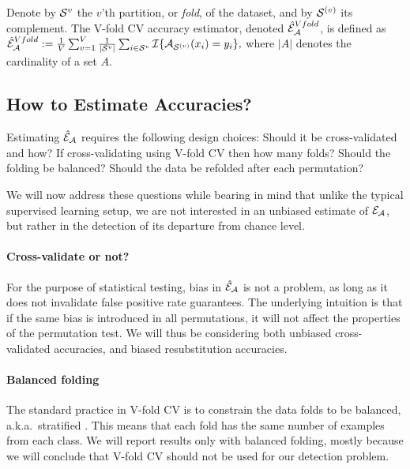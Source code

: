 \documentclass[]{bio}
\begin{document}
\begin{definition}
	\label{def:v-fold}
	Denote by $\mathcal{S}^{v}$ the $v$'th partition, or \emph{fold}, of the dataset, and by $\mathcal{S}^{(v)}$ its complement.
	The V-fold CV accuracy estimator, denoted $\hat{\mathcal{E}}_{\mathcal{A}}^{Vfold}$, is defined as 	
	$\hat{\mathcal{E}}_{\mathcal{A}}^{Vfold} := 
	\frac 1V \sum_{v=1}^{V} \frac{1}{|\mathcal{S}^v|} \sum_{i \in \mathcal{S}^{v}} \mathcal{I}{\{ \mathcal{A}_{\mathcal{S}^{(v)}}(x_i)=y_i \}},$
	where $|A|$ denotes the cardinality of a set $A$.
\end{definition}




\subsection{How to Estimate Accuracies?}
\label{sec:considerations}

Estimating $\hat{\mathcal{E}}_{\mathcal{A}}$ requires the following design choices: 
Should it be cross-validated and how? 
If cross-validating using V-fold CV then how many folds? 
Should the folding be balanced?
Should the data be refolded after each permutation? 

We will now address these questions while bearing in mind that unlike the typical supervised learning setup, we are not interested in an unbiased estimate of $\mathcal{E}_{\mathcal{A}}$, but rather in the detection of its departure from chance level. 

\paragraph{Cross-validate or not?}
For the purpose of statistical testing, bias in $\hat{\mathcal{E}}_{\mathcal{A}}$ is not a problem, as long as it does not invalidate false positive rate guarantees. 
The underlying intuition is that if the same bias is introduced in all permutations, it will not affect the properties of the permutation test. 
We will thus be considering both unbiased cross-validated accuracies, and biased resubstitution accuracies.


\paragraph{Balanced folding}
The standard practice in V-fold CV is to constrain the data folds to be balanced, a.k.a.\ stratified \cite[for example]{ojala_permutation_2010}.
This means that each fold has the same number of examples from each class. 
We will report results only with balanced folding, mostly because we will conclude that V-fold CV should not be used for our detection problem. 
\end{document}
